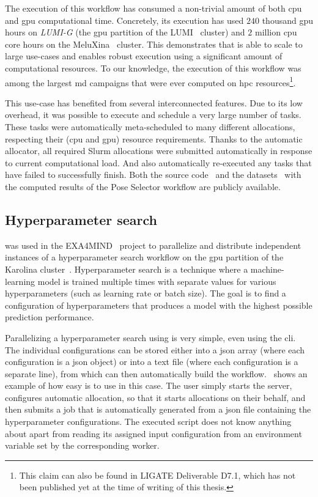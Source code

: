 The execution of this workflow has consumed a non-trivial amount of both \gls{cpu}
and \gls{gpu} computational time. Concretely, its execution has used
$240$ thousand \gls{gpu} hours on \emph{LUMI-G}
(the \gls{gpu} partition of the LUMI~\cite{lumi} cluster) and
$2$ million \gls{cpu} core hours on the
MeluXina~\cite{meluxina} cluster. This demonstrates that \hyperqueue{} is able to
scale to large use-cases and enables robust execution using a significant amount of computational
resources. To our knowledge, the execution of this workflow was among the largest
\gls{md} campaigns that were ever computed on \gls{hpc}
resources\footnote{This claim can also be found in LIGATE Deliverable D7.1, which has not been published yet at the time of writing of this thesis.}.

This use-case has benefited from several interconnected \hyperqueue{} features. Due to
its low overhead, it was possible to execute and schedule a very large number of tasks. These tasks
were automatically meta-scheduled to many different allocations, respecting their
(\gls{cpu} and \gls{gpu}) resource requirements. Thanks to the
automatic allocator, all required Slurm allocations were submitted automatically in response to
current computational load. And \hyperqueue{} also automatically re-executed any tasks
that have failed to successfully finish. Both the source code~\cite{ps-workflow} and the
datasets~\cite{ps_dataset_1,ps_dataset_2} with the computed results of the Pose Selector workflow are
publicly available.

\subsection{Hyperparameter search}
\hyperqueue{} was used in the EXA4MIND~\cite{exa4mind} project to parallelize and
distribute independent instances of a hyperparameter search workflow on the \gls{gpu}
partition of the Karolina cluster~\cite{karolina}. Hyperparameter search is a technique
where a machine-learning model is trained multiple times with separate values for various
hyperparameters (such as learning rate or batch size). The goal is to find a configuration of
hyperparameters that produces a model with the highest possible prediction performance.

Parallelizing a hyperparameter search using \hyperqueue{} is very simple, even using the
\gls{cli}. The individual configurations can be stored either into a
\gls{json} array (where each configuration is a \gls{json} object) or
into a text file (where each configuration is a separate line), from which \hq{}
can then automatically build the workflow.~ shows an example of how easy is
to use \hq{} in this case. The user simply starts the server, configures
automatic allocation, so that it starts allocations on their behalf, and then submits a job that is
automatically generated from a \gls{json} file containing the hyperparameter
configurations. The executed script does not know anything about \hyperqueue{} apart from
reading its assigned input configuration from an environment variable set by the corresponding
worker.

